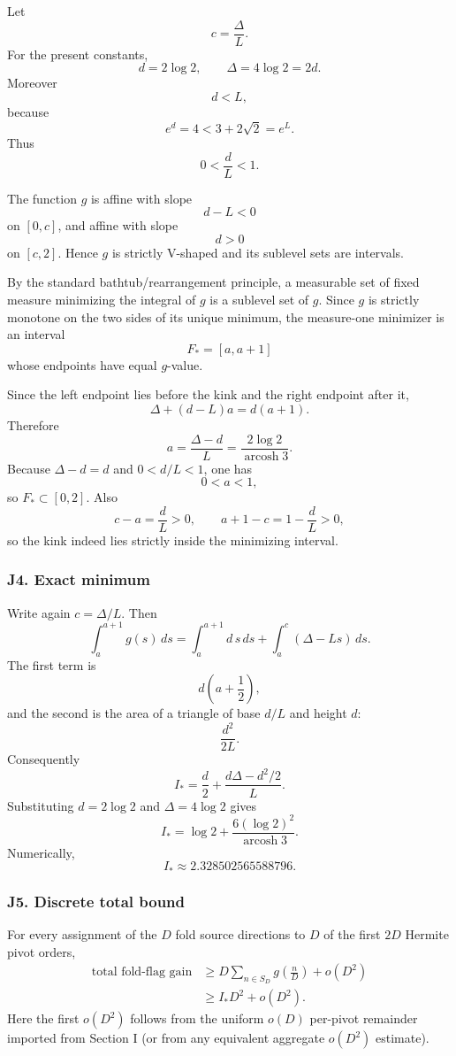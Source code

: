 \documentclass[
  10pt,
  letterpaper,
]{article}
\theoremstyle{definition}
\theoremstyle{remark}
\begin{document}
Let \[
c=\frac{\Delta}{L}.
\] For the present constants, \[
d=2\log2,
\qquad
\Delta=4\log2=2d.
\] Moreover \[
d<L,
\] because \[
e^d=4<3+2\sqrt2=e^L.
\] Thus \[
0<\frac dL<1.
\]

The function \(g\) is affine with slope \[
d-L<0
\] on \([0,c]\), and affine with slope \[
d>0
\] on \([c,2]\). Hence \(g\) is strictly V-shaped and its sublevel sets
are intervals.

By the standard bathtub/rearrangement principle, a measurable set of
fixed measure minimizing the integral of \(g\) is a sublevel set of
\(g\). Since \(g\) is strictly monotone on the two sides of its unique
minimum, the measure-one minimizer is an interval \[
F_*=[a,a+1]
\] whose endpoints have equal \(g\)-value.

Since the left endpoint lies before the kink and the right endpoint
after it, \[
\Delta+(d-L)a=d(a+1).
\] Therefore \[
\boxed{
a=\frac{\Delta-d}{L}
=\frac{2\log2}{\operatorname{arcosh}3}.
}
\] Because \(\Delta-d=d\) and \(0<d/L<1\), one has \[
0<a<1,
\] so \(F_*\subset[0,2]\). Also \[
c-a=\frac dL>0,
\qquad
a+1-c=1-\frac dL>0,
\] so the kink indeed lies strictly inside the minimizing interval.

\subsubsection{J4. Exact minimum}\label{j4.-exact-minimum}

Write again \(c=\Delta/L\). Then \[
\int_{a}^{a+1}g(s)\,ds
=
\int_a^{a+1} d\,s\,ds
+
\int_a^c(\Delta-Ls)\,ds.
\] The first term is \[
d\left(a+\frac12\right),
\] and the second is the area of a triangle of base \(d/L\) and height
\(d\): \[
\frac{d^2}{2L}.
\] Consequently \[
I_*
=
\frac d2+
\frac{d\Delta-d^2/2}{L}.
\] Substituting \(d=2\log2\) and \(\Delta=4\log2\) gives \[
\boxed{
I_*
=
\log2+
\frac{6(\log2)^2}{\operatorname{arcosh}3}.
}
\] Numerically, \[
I_*\approx2.328502565588796.
\]

\subsubsection{J5. Discrete total bound}\label{j5.-discrete-total-bound}

For every assignment of the \(D\) fold source directions to \(D\) of the
first \(2D\) Hermite pivot orders, \[
\begin{aligned}
\text{total fold-flag gain}
&\ge
D\sum_{n\in S_D}
 g\!\left(\frac nD\right)
+o(D^2)\\
&\ge
I_*D^2+o(D^2).
\end{aligned}
\] Here the first \(o(D^2)\) follows from the uniform \(o(D)\) per-pivot
remainder imported from Section I (or from any equivalent aggregate
\(o(D^2)\) estimate).
\end{document}
